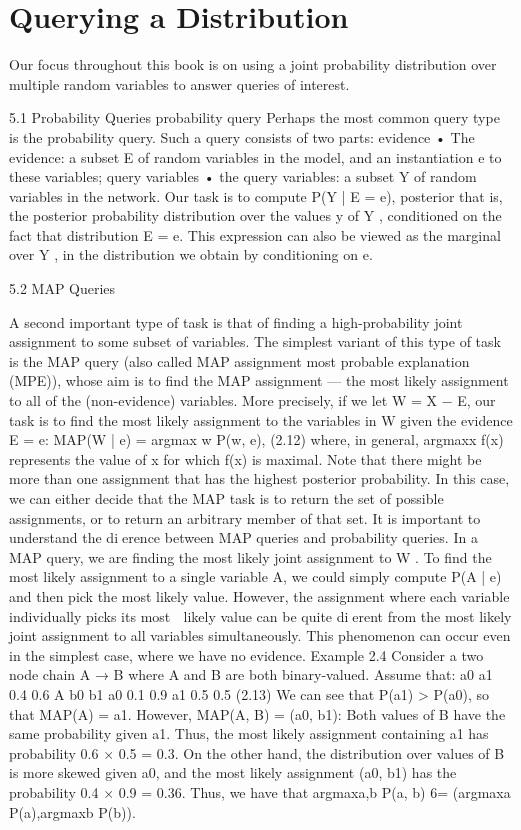 \section{Querying a Distribution}

Our focus throughout this book is on using a joint probability distribution over multiple random variables to answer queries of interest.

5.1 Probability Queries
probability query Perhaps the most common query type is the probability query. Such a query consists of two parts: evidence • The evidence: a subset E of random variables in the model, and an instantiation e to these variables; query variables • the query variables: a subset Y of random variables in the network. Our task is to compute P(Y | E = e), posterior that is, the posterior probability distribution over the values y of Y , conditioned on the fact that distribution E = e. This expression can also be viewed as the marginal over Y , in the distribution we obtain by conditioning on e.

5.2 MAP Queries

A second important type of task is that of finding a high-probability joint assignment to some subset of variables. The simplest variant of this type of task is the MAP query (also called MAP assignment most probable explanation (MPE)), whose aim is to find the MAP assignment — the most likely assignment to all of the (non-evidence) variables. More precisely, if we let W = X − E, our task is to find the most likely assignment to the variables in W given the evidence E = e: MAP(W | e) = argmax w P(w, e), (2.12) where, in general, argmaxx f(x) represents the value of x for which f(x) is maximal. Note that there might be more than one assignment that has the highest posterior probability. In this case, we can either decide that the MAP task is to return the set of possible assignments, or to return an arbitrary member of that set. It is important to understand the dierence between MAP queries and probability queries. In a MAP query, we are finding the most likely joint assignment to W . To find the most likely assignment to a single variable A, we could simply compute P(A | e) and then pick the most likely value. However, the assignment where each variable individually picks its most  likely value can be quite dierent from the most likely joint assignment to all variables simultaneously. This phenomenon can occur even in the simplest case, where we have no evidence. Example 2.4 Consider a two node chain A → B where A and B are both binary-valued. Assume that: a0 a1 0.4 0.6 A b0 b1 a0 0.1 0.9 a1 0.5 0.5 (2.13) We can see that P(a1) > P(a0), so that MAP(A) = a1. However, MAP(A, B) = (a0, b1): Both values of B have the same probability given a1. Thus, the most likely assignment containing a1 has probability 0.6 × 0.5 = 0.3. On the other hand, the distribution over values of B is more skewed given a0, and the most likely assignment (a0, b1) has the probability 0.4 × 0.9 = 0.36. Thus, we have that argmaxa,b P(a, b) 6= (argmaxa P(a),argmaxb P(b)).

